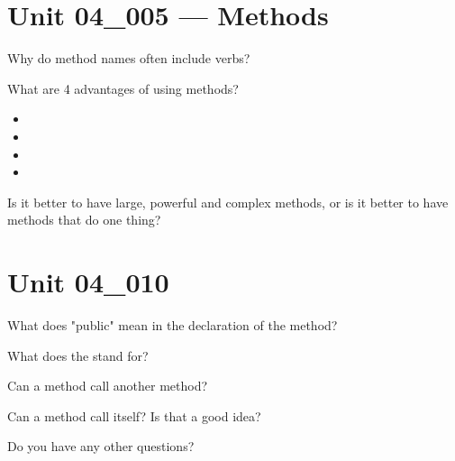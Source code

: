 \documentclass[letterpaper,12pt]{exam}
\newcommand{\unit}{Unit 04}
\begin{document}
\begin{questions}

\section*{\unit\_005 --- Methods} %

\begin{samepage}
	\question Why do method names often include verbs?
	\vspace{5mm}
\end{samepage}

\begin{samepage}
	\question What are 4 advantages of using methods?
	  \begin{itemize}
		\item 
		\vspace{5mm}
		\item 
		\vspace{5mm}
		\item 
		\vspace{5mm}
		\item 
		\vspace{5mm}
	   \end{itemize}
\end{samepage}

\begin{samepage}
	\question Is it better to have large, powerful and complex methods, or is it better to have methods that do one thing?
	\vspace{5mm}
\end{samepage}

\section*{\unit\_010} %

\begin{samepage}
	\question What does "public" mean in the declaration of the method?
	\vspace{5mm}
\end{samepage}

\begin{samepage}
	\question What does the  stand for?
	\vspace{5mm}
\end{samepage}

\begin{samepage}
	\question Can a method call another method?
	\vspace{5mm}
\end{samepage}
\begin{samepage}
	\question Can a method call itself?  Is that a good idea?
	\vspace{5mm}
\end{samepage}



\begin{samepage}
	\question Do you have any other questions?
	\vspace{30mm}
\end{samepage}

\end{questions}
\end{document}
